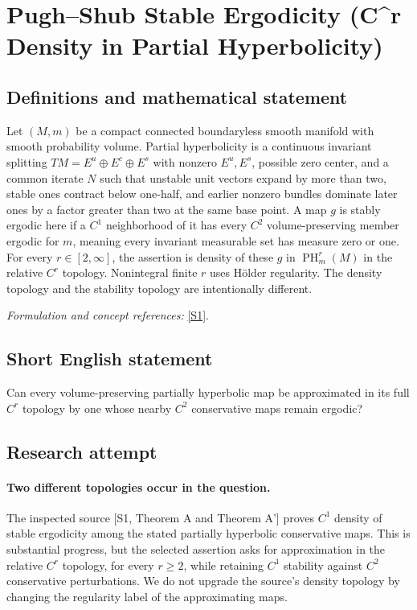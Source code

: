 \documentclass[11pt]{article}
\begin{document}
\section*{\texorpdfstring{Pugh–Shub Stable Ergodicity (C\textasciicircum{}r Density in Partial Hyperbolicity)}{Pugh–Shub Stable Ergodicity (C\textasciicircum{}r Density in Partial Hyperbolicity)}}\label{30006899}
\subsection{Definitions and mathematical statement}
Let $(M,m)$ be a compact connected boundaryless smooth manifold with smooth probability volume. Partial hyperbolicity is a continuous invariant splitting $TM=E^u\oplus E^c\oplus E^s$ with nonzero $E^u,E^s$, possible zero center, and a common iterate $N$ such that unstable unit vectors expand by more than two, stable ones contract below one-half, and earlier nonzero bundles dominate later ones by a factor greater than two at the same base point. A map $g$ is stably ergodic here if a $C^1$ neighborhood of it has every $C^2$ volume-preserving member ergodic for $m$, meaning every invariant measurable set has measure zero or one. For every $r\in[2,\infty]$, the assertion is density of these $g$ in $\operatorname{PH}_m^r(M)$ in the relative $C^r$ topology. Nonintegral finite $r$ uses H\"older regularity. The density topology and the stability topology are intentionally different.
\par\smallskip\textit{Formulation and concept references:} \href{https://arxiv.org/pdf/1709.04983}{[S1]}.

\subsection{Short English statement}
Can every volume-preserving partially hyperbolic map be approximated in its full $C^r$ topology by one whose nearby $C^2$ conservative maps remain ergodic?
\subsection{Research attempt}
\paragraph{Two different topologies occur in the question.}
The inspected source [S1, Theorem A and Theorem A'] proves
$C^1$ density of stable ergodicity among the stated partially
hyperbolic conservative maps. This is substantial progress, but
the selected assertion asks for approximation in the relative
$C^r$ topology, for every $r\geq2$, while retaining $C^1$ stability
against $C^2$ conservative perturbations. We do not upgrade the
source's density topology by changing the regularity label of the
approximating maps.
\end{document}
